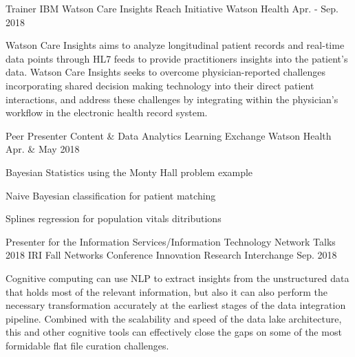 

\begin{cventries}

  \cventry
    {Trainer} %
    {IBM Watson Care Insights Reach Initiative} %
    {Watson Health} %
    {Apr. - Sep. 2018} %
    {
      \begin{cvitems} %
        \item {Watson Care Insights aims to analyze longitudinal patient records and real-time data points through HL7 feeds to provide practitioners insights into the patient’s data.  Watson Care Insights seeks to overcome physician-reported challenges incorporating shared decision making technology into their direct patient interactions, and address these challenges by integrating within the physician's workflow in the electronic health record system.}
      \end{cvitems}
    }

  \cventry
    {Peer Presenter} %
    {Content \& Data Analytics Learning Exchange} %
    {Watson Health} %
    {Apr. \& May 2018} %
    {
      \begin{cvitems} %
        \item {Bayesian Statistics using the Monty Hall problem example}
        \item {Naive Bayesian classification for patient matching}
        \item {Splines regression for population vitals ditributions}
      \end{cvitems}
    }

  \cventry
    {Presenter for the Information Services/Information Technology Network Talks} %
    {2018 IRI Fall Networks Conference} %
    {Innovation Research Interchange} %
    {Sep. 2018} %
    {
      \begin{cvitems} %
        \item {Cognitive computing can use NLP to extract insights from the unstructured data that holds most of the relevant information, but also it can also perform the necessary transformation accurately at the earliest stages of the data integration pipeline.  Combined with the scalability and speed of the data lake architecture, this and other cognitive tools can effectively close the gaps on some of the most formidable flat file curation challenges.}
      \end{cvitems}
    }


\end{cventries}
